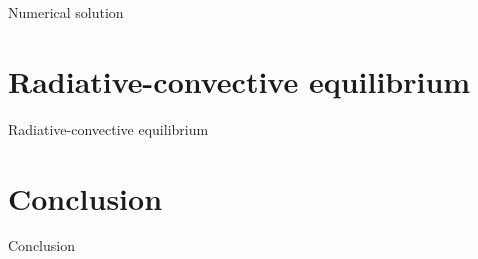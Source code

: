 \documentclass[aspectratio=43]{beamer}
\begin{document}
\begin{frame}{Numerical solution}
\end{frame}



\section{Radiative-convective equilibrium}
\begin{frame}{Radiative-convective equilibrium}
\end{frame}



\section{Conclusion}
\begin{frame}{Conclusion}
\end{frame}
\end{document}
